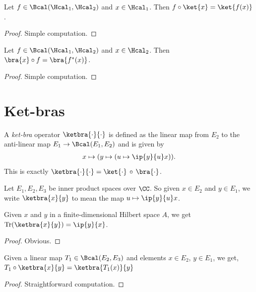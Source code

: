  \begin{lemma}\label{linearMap_comp_ket}\leanok
  Let $f\in\Bcal(\Hcal_1,\Hcal_2)$ and $x\in\Hcal_1$. Then $f\circ\ket{x}=\ket{f(x)}$.
 \end{lemma}
 \begin{proof}\leanok
  Simple computation.
 \end{proof}
 \begin{lemma}\label{bra_comp_linearMap}\leanok
  Let $f\in\Bcal(\Hcal_1,\Hcal_2)$ and $x\in\Hcal_2$. Then $\bra{x}\circ f=\bra{f^*(x)}$.
 \end{lemma}
 \begin{proof}\leanok
  Simple computation.
 \end{proof}

\section{Ket-bras}
 \begin{definition}\label{rankOne}\leanok
  A \textit{ket-bra} operator $\ketbra{\cdot}{\cdot}$ is defined as the linear map from $E_2$ to the anti-linear map $E_1\to\Bcal(E_1,E_2)$ and is given by
  \begin{align*}
   x\mapsto(y\mapsto(u\mapsto\ip{y}{u}x)).
  \end{align*}
  This is exactly $\ketbra{\cdot}{\cdot}=\ket{\cdot}\,\circ\,\bra{\cdot}$.
 \end{definition}
 Let $E_1,E_2,E_3$ be inner product spaces over $\CC$.
 So given $x\in{E_2}$ and $y\in{E_1}$, we write $\ketbra{x}{y}$ to mean the map $u\mapsto\ip{y}{u}x$.

 \begin{lemma}\label{rankOne_trace}\leanok
  Given $x$ and $y$ in a finite-dimensional Hilbert space $A$, we get $\operatorname{Tr}(\ketbra{x}{y})=\ip{y}{x}$.
 \end{lemma}
 \begin{proof}\leanok
  Obvious.
 \end{proof}

 \begin{corollary}\label{linearMap_comp_rankOne}\leanok
  Given a linear map $T_1\in\Bcal(E_2,E_3)$ and elements $x\in E_2$, $y\in{E_1}$, we get, $T_1\circ\ketbra{x}{y}=\ketbra{T_1(x)}{y}$
 \end{corollary}
 \begin{proof}\leanok
  Straightforward computation.
 \end{proof}
 
